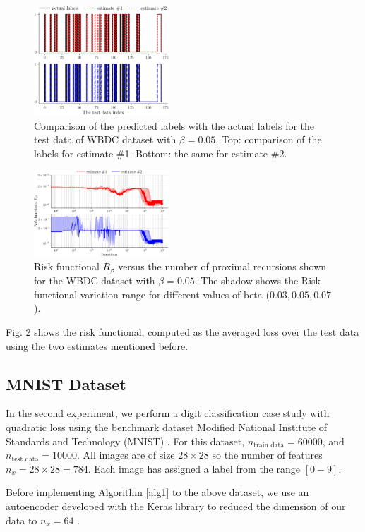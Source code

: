 \documentclass{article}
\begin{document}
\begin{figure}[h]
\centering
\includegraphics[width=0.45\textwidth]{f_hat_WBDC.png}
\caption{Comparison of the predicted labels with the actual labels for the test data of WBDC dataset with $\beta=0.05$. Top: comparison of the labels for estimate \#1. Bottom: the same for estimate \#2.}
\label{fig_f_hat_and_labels}
\end{figure}
\begin{figure}[h]
\centering
\includegraphics[width=0.45\textwidth]{Risk_WBDC.png}
\caption{Risk functional $R_{\beta}$ versus the number of proximal recursions shown for the WBDC dataset with $\beta=0.05$. The shadow shows the Risk functional variation range for different values of beta ($0.03,0.05,0.07$).}
\label{fig_risk}
\end{figure}
Fig. 2 shows the risk functional, computed as the averaged loss over the test data using the two estimates mentioned before.
\subsection{MNIST Dataset}
In the second experiment, we perform a digit classification case study with quadratic loss using the benchmark dataset Modified National Institute of Standards and Technology (MNIST) \cite{lecun1998gradient}. For this dataset, $n_{\text{train data}} = 60000$, and $n_{\text{test data}} = 10000$. All images are of size $28 \times 28$ so the number of features $n_x= 28 \times 28 =784$. Each image has assigned a label from the range $[0-9]$.

Before implementing Algorithm \ref{alg1} to the above dataset, we use an autoencoder developed with the Keras library to reduced the dimension of our data to $n_x = 64$ \cite{keras}. 
\end{document}
